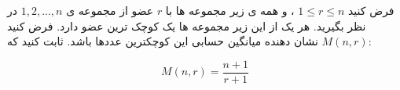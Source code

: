 \exercise
فرض کنيد 
$1 \leq r \leq n$
، و همه ی زير مجموعه ها با 
$r$
 عضو از مجموعه ی 
${1, 2, ..., n}$
  در نظر بگيريد. هر يک از اين زير مجموعه ها يک کوچک ترين عضو دارد. فرض کنيد 
$M(n, r)$
  نشان دهنده ميانگين حسابی اين کوچکترين عددها باشد. ثابت کنيد که:
  
$$M(n, r) = \frac{n+1}{r+1}$$